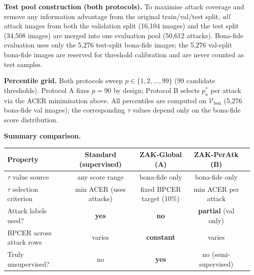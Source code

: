 \documentclass{article}
\begin{document}
\begin{tcolorbox}[
  colback=zakblue!60,
  colframe=blue!50!black,
  title={\textbf{ZAK Protocol Definition and Justification}},
  fonttitle=\small\bfseries,
  fontupper=\small
]
\medskip
\textbf{Test pool construction (both protocols).}
To maximise attack coverage and remove any information advantage from the
original train/val/test split, \emph{all} attack images from both the
validation split (16{,}104 images) and the test split (34{,}508 images)
are merged into one evaluation pool (50{,}612 attacks).
Bona-fide evaluation uses only the 5{,}276 test-split bona-fide images;
the 5{,}276 val-split bona-fide images are reserved for threshold calibration
and are never counted as test samples.

\medskip
\textbf{Percentile grid.}
Both protocols sweep $p \in \{1, 2, \ldots, 99\}$ (99 candidate thresholds).
Protocol A fixes $p=90$ by design; Protocol B selects $p_a^*$ per attack
via the ACER minimisation above.
All percentiles are computed on $\mathcal{V}_{\mathrm{bon}}$ (5{,}276
bona-fide val images); the corresponding $\tau$ values depend only on the
bona-fide score distribution.

\medskip
\textbf{Summary comparison.}

\begin{center}
\scriptsize
\setlength{\tabcolsep}{4pt}
\begin{tabular}{lcccc}
\toprule
\textbf{Property} & \textbf{Standard (supervised)} & \textbf{ZAK-Global (A)} & \textbf{ZAK-PerAtk (B)} \\
\midrule
$\tau$ value source & any score range & bona-fide only & bona-fide only \\
$\tau$ selection criterion & min ACER (uses attacks) & fixed BPCER target (10\%) & min ACER per attack \\
Attack labels used? & \textbf{yes} & \textbf{no} & \textbf{partial} (val only) \\
BPCER across attack rows & varies & \textbf{constant} & varies \\
Truly unsupervised? & no & \textbf{yes} & no (semi-supervised) \\
\bottomrule
\end{tabular}
\end{center}
\end{tcolorbox}

\vspace{6pt}
\end{document}
